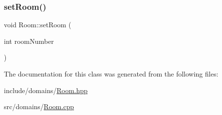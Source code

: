 \mbox{\label{class_room_ae1645c6cc522f4b1c0ba980736cb440d}} 
\subsubsection{\texorpdfstring{setRoom()}{setRoom()}}
{\footnotesize\ttfamily void Room\+::set\+Room (\begin{DoxyParamCaption}\item[{int}]{room\+Number }\end{DoxyParamCaption})}



The documentation for this class was generated from the following files\+:\begin{DoxyCompactItemize}
\item 
include/domains/\mbox{\hyperlink{_room_8hpp}{Room.\+hpp}}\item 
src/domains/\mbox{\hyperlink{_room_8cpp}{Room.\+cpp}}\end{DoxyCompactItemize}
